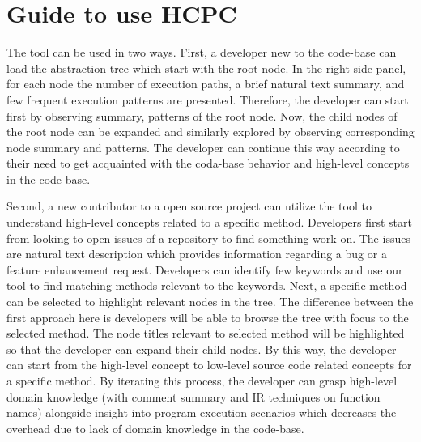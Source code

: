 
\section{Guide to use HCPC}
The tool can be used in two ways. First, a developer new to the code-base can load the abstraction tree which start with the root node. In the right side panel, for each node the number of execution paths, a brief natural text summary, and few frequent execution patterns are presented. Therefore, the developer can start first by observing summary, patterns of the root node. Now, the child nodes of the root node can be expanded and  similarly explored by observing corresponding node summary and patterns. The developer can continue this way according to their need to get acquainted with the coda-base behavior and high-level concepts in the code-base.

Second, a new contributor to a open source project can utilize the tool to understand high-level concepts related to a specific method. Developers first start from looking to open issues of a repository to find something work on. The issues are natural text description which provides information regarding a bug or a feature enhancement request. Developers can identify few keywords and use our tool to find matching methods relevant to the keywords. Next, a specific method can be selected to highlight relevant nodes in the tree. The difference between the first approach here is developers will be able to browse the tree with focus to the selected method. The node titles relevant to selected method will be highlighted so that the developer can expand their child nodes. By this way, the developer can start from the high-level concept to low-level source code related concepts for a specific method. By iterating this process, the developer can grasp high-level domain knowledge (with comment summary and IR techniques on function names) alongside insight into program execution scenarios which decreases the overhead due to lack of domain knowledge in the code-base. 

